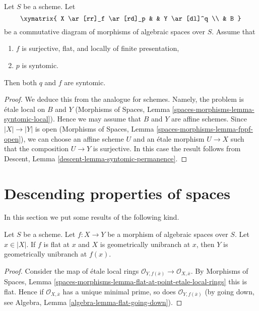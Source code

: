 \begin{lemma}
\label{lemma-syntomic-permanence}
Let $S$ be a scheme. Let
$$
\xymatrix{
X \ar[rr]_f \ar[rd]_p & &
Y \ar[dl]^q \\
& B
}
$$
be a commutative diagram of morphisms of algebraic spaces over $S$. Assume that
\begin{enumerate}
\item $f$ is surjective, flat, and locally of finite presentation,
\item $p$ is syntomic.
\end{enumerate}
Then both $q$ and $f$ are syntomic.
\end{lemma}

\begin{proof}
We deduce this from the analogue for schemes.
Namely, the problem is \'etale local on $B$ and $Y$
(Morphisms of Spaces, Lemma
\ref{spaces-morphisms-lemma-syntomic-local}).
Hence we may assume that $B$ and $Y$ are affine
schemes. Since $|X| \to |Y|$ is open
(Morphisms of Spaces, Lemma \ref{spaces-morphisms-lemma-fppf-open}),
we can choose an affine
scheme $U$ and an \'etale morphism $U \to X$ such that the
composition $U \to Y$ is surjective. In this case the result
follows from Descent, Lemma
\ref{descent-lemma-syntomic-permanence}.
\end{proof}










\section{Descending properties of spaces}
\label{section-descending-properties-spaces}

\noindent
In this section we put some results of the following kind.

\begin{lemma}
\label{lemma-descend-unibranch}
Let $S$ be a scheme.
Let $f : X \to Y$ be a morphism of algebraic spaces over $S$.
Let $x \in |X|$.
If $f$ is flat at $x$ and $X$ is geometrically unibranch at $x$, then $Y$ is
geometrically unibranch at $f(x)$.
\end{lemma}

\begin{proof}
Consider the map of \'etale local rings
$\mathcal{O}_{Y, f(\overline{x})} \to \mathcal{O}_{X, \overline{x}}$.
By
Morphisms of Spaces, Lemma
\ref{spaces-morphisms-lemma-flat-at-point-etale-local-rings}
this is flat. Hence if $\mathcal{O}_{X, \overline{x}}$ has a unique minimal
prime, so does $\mathcal{O}_{Y, f(\overline{x})}$ (by going down, see
Algebra, Lemma \ref{algebra-lemma-flat-going-down}).
\end{proof}

